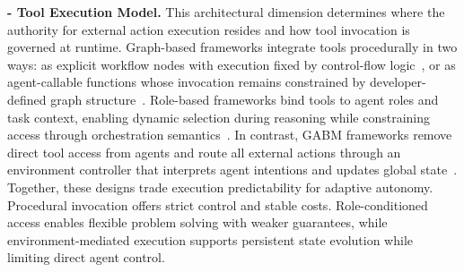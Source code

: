 
\smallskip
\noindent\textbf{- Tool Execution Model.}
This architectural dimension determines where the authority for external action execution resides and how tool invocation is governed at runtime. Graph-based frameworks integrate tools procedurally in two ways: as explicit workflow nodes with execution fixed by control-flow logic~\cite{langgraph2025,langflow2025,n8n2025}, or as agent-callable functions whose invocation remains constrained by developer-defined graph structure~\cite{langgraph2025,autogpt2025}. Role-based frameworks bind tools to agent roles and task context, enabling dynamic selection during reasoning while constraining access through orchestration semantics~\cite{crewai2025,wu2024autogen,openaiagents2025,OpenAgents}. In contrast, GABM frameworks remove direct tool access from agents and route all external actions through an environment controller that interprets agent intentions and updates global state~\cite{vezhnevets2023generative}. Together, these designs trade execution predictability for adaptive autonomy. Procedural invocation offers strict control and stable costs. Role-conditioned access enables flexible problem solving with weaker guarantees, while environment-mediated execution supports persistent state evolution while limiting direct agent control.\shorten

